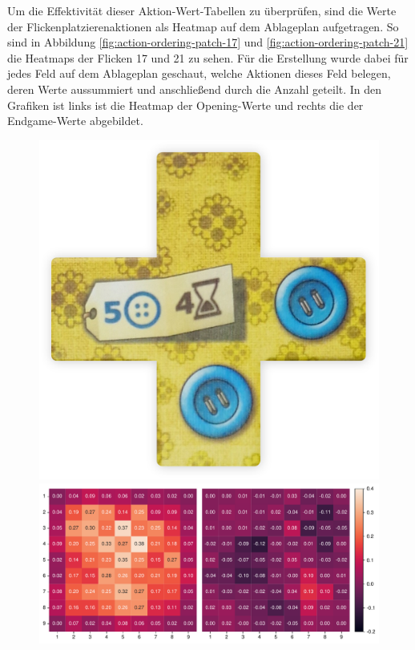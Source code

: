 Um die Effektivität dieser Aktion-Wert-Tabellen zu überprüfen, sind die Werte der Flickenplatzierenaktionen als Heatmap auf dem Ablageplan aufgetragen. So sind in Abbildung \ref{fig:action-ordering-patch-17} und \ref{fig:action-ordering-patch-21} die Heatmaps der Flicken 17 und 21 zu sehen. Für die Erstellung wurde dabei für jedes Feld auf dem Ablageplan geschaut, welche Aktionen dieses Feld belegen, deren Werte aussummiert und anschließend durch die Anzahl geteilt. In den Grafiken ist links ist die Heatmap der Opening-Werte und rechts die der Endgame-Werte abgebildet.

\vspace*{-0.77cm}

\begin{figure}[!ht]
    \centering
    \begin{minipage}{.11\textwidth}
        \centering
        \includegraphics[width=\linewidth]{res/pictures/assets/17-front.png}
    \end{minipage}
    \begin{minipage}{.78\textwidth}
        \centering
        \includegraphics[width=\linewidth]{res/pictures/plots/17-action-ordering.pdf}

\end{minipage}
\end{figure}
